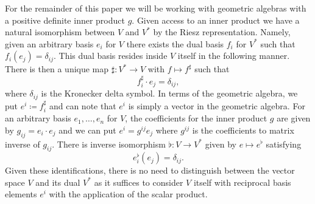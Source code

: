 For the remainder of this paper we will be working with geometric algebras with a positive definite inner product $g$. Given access to an inner product we have a natural isomorphism between $V$ and $V^*$ by the Riesz representation.  Namely, given an arbitrary basis $e_i$ for $V$ there exists the dual basis $f_i$ for $V^*$ such that $f_i(e_j)=\delta_{ij}$.  This dual basis resides inside $V$ itself in the following manner. There is then a unique map $\sharp \colon V^* \to V$ with $f\mapsto f^\sharp$ such that
\[
f_i^\sharp \cdot e_j = \delta_{ij},
\]
where $\delta_{ij}$ is the Kronecker delta symbol. In terms of the geometric algebra, we put $e^i \coloneqq f_i^\sharp$ and can note that $e^i$ is simply a vector in the geometric algebra. For an arbitrary basis $e_1,\dots,e_n$ for $V$, the coefficients for the inner product $g$ are given by $g_{ij}=e_i\cdot e_j$ and we can put $e^i = g^{ij}e_j$ where $g^{ij}$ is the coefficients to matrix inverse of $g_{ij}$.  There is inverse isomorphism $\flat \colon V \to V^*$ given by $e \mapsto e^\flat$ satisfying
\[
e_i^\flat (e_j)= \delta_{ij}.
\]
Given these identifications, there is no need to distinguish between the vector space $V$ and its dual $V^*$ as it suffices to consider $V$ itself with reciprocal basis elements $e^i$ with the application of the scalar product.

